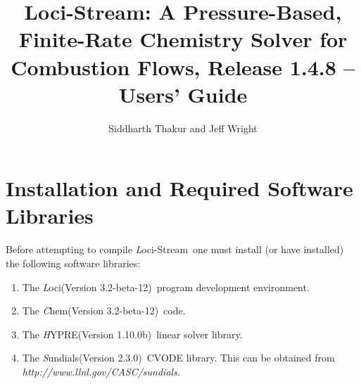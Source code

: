 \documentclass{article}
\begin{document}
\title{Loci-Stream: A Pressure-Based, Finite-Rate Chemistry Solver for
Combustion Flows, Release 1.4.8 -- Users' Guide}
                                                                                
\author{Siddharth Thakur and Jeff Wright}

\maketitle

\newcommand{\cpp}{$C^{++}$}
\newcommand{\CVODE}{\emph CVODE}
\newcommand{\Loci}{\emph Loci(Version 3.2-beta-12)}
\newcommand{\Stream}{\emph Loci-Stream}
\newcommand{\Hypre}{\emph HYPRE(Version 1.10.0b)}
\newcommand{\Sundials}{\emph Sundials(Version 2.3.0)}
\newcommand{\Chemkin}{\emph Chemkin}
\newcommand{\Chem}{\emph Chem(Version 3.2-beta-12)}
\newcommand{\ChemUsersGuide}{\emph Chem 3: A Finite-Rate Viscous Chemistry Solver - The User Guide}

\section{Installation and Required Software Libraries}

Before attempting to compile \Stream\ one must install (or have installed) the
following software libraries:

\begin{enumerate}
  \item The \Loci\ program development environment.
  \item The \Chem\ code.
  \item The \Hypre\ linear solver library.
  \item The \Sundials\ CVODE library. This can be obtained from
\emph{http://www.llnl.gov/CASC/sundials}.
\end{enumerate}
\end{document}
